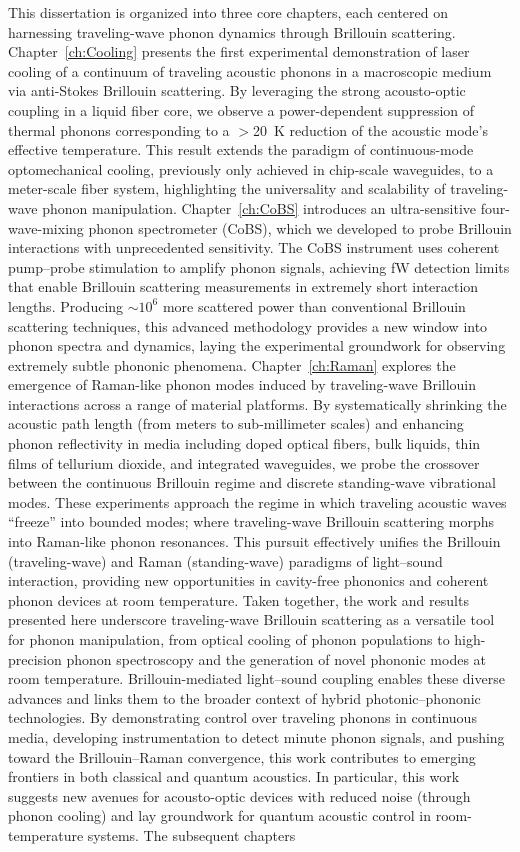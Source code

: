 This dissertation is organized into three core chapters, each centered on harnessing traveling-wave phonon dynamics through Brillouin scattering. Chapter~\ref{ch:Cooling} presents the first experimental demonstration of laser cooling of a continuum of traveling acoustic phonons in a macroscopic medium via anti-Stokes Brillouin scattering. By leveraging the strong acousto-optic coupling in a liquid fiber core, we observe a power-dependent suppression of thermal phonons corresponding to a \(>\)\SI{20}{\kelvin} reduction of the acoustic mode’s effective temperature. This result extends the paradigm of continuous-mode optomechanical cooling, previously only achieved in chip-scale waveguides, to a meter-scale fiber system, highlighting the universality and scalability of traveling-wave phonon manipulation. Chapter~\ref{ch:CoBS} introduces an ultra-sensitive four-wave-mixing phonon spectrometer (\acs{CoBS}), which we developed to probe Brillouin interactions with unprecedented sensitivity. The \ac{CoBS} instrument uses coherent pump–probe stimulation to amplify phonon signals, achieving \si{\femto\watt} detection limits that enable Brillouin scattering measurements in extremely short interaction lengths. Producing \(\sim\)\(10^{6}\) more scattered power than conventional Brillouin scattering techniques, this advanced methodology provides a new window into phonon spectra and dynamics, laying the experimental groundwork for observing extremely subtle phononic phenomena. Chapter~\ref{ch:Raman} explores the emergence of Raman-like phonon modes induced by traveling-wave Brillouin interactions across a range of material platforms. By systematically shrinking the acoustic path length (from meters to sub-millimeter scales) and enhancing phonon reflectivity in media including doped optical fibers, bulk liquids, thin films of tellurium dioxide, and integrated waveguides, we probe the crossover between the continuous Brillouin regime and discrete standing-wave vibrational modes. These experiments approach the regime in which traveling acoustic waves “freeze” into bounded modes; where traveling-wave Brillouin scattering morphs into Raman-like phonon resonances. This pursuit effectively unifies the Brillouin (traveling-wave) and Raman (standing-wave) paradigms of light–sound interaction, providing new opportunities in cavity-free phononics and coherent phonon devices at room temperature. Taken together, the work and results presented here underscore traveling-wave Brillouin scattering as a versatile tool for phonon manipulation, from optical cooling of phonon populations to high-precision phonon spectroscopy and the generation of novel phononic modes at room temperature. Brillouin-mediated light–sound coupling enables these diverse advances and links them to the broader context of hybrid photonic–phononic technologies. By demonstrating control over traveling phonons in continuous media, developing instrumentation to detect minute phonon signals, and pushing toward the Brillouin–Raman convergence, this work contributes to emerging frontiers in both classical and quantum acoustics. In particular, this work suggests new avenues for acousto-optic devices with reduced noise (through phonon cooling) and lay groundwork for quantum acoustic control in room-temperature systems. The subsequent chapters 